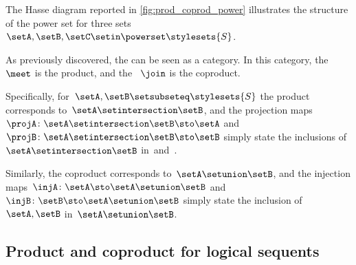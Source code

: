 \begin{marginfigure}
    \centering
    \caption{}
    \label{fig:prod_coprod_power}
\end{marginfigure}

The Hasse diagram reported in \cref{fig:prod_coprod_power} illustrates the structure of the power set  for three sets~$\setA,\setB,\setC\setin \powerset \stylesets{S}$.

As previously discovered, the  can be seen as a category.
In this category, the ~$\meet$ is the product, and the ~$\join$ is the coproduct.

Specifically, for~$\setA,\setB\setsubseteq\stylesets{S}$ the product corresponds to~$\setA\setintersection \setB$, and the projection maps~$\projA\colon \setA\setintersection \setB \sto \setA$ and~$\projB\colon \setA\setintersection \setB \sto \setB$ simply state the inclusions of~$\setA\setintersection \setB$ in~\setA and~\setB.

Similarly, the coproduct corresponds to~$\setA\setunion \setB$, and the injection maps~$\injA\colon \setA \sto \setA\setunion \setB$ and~$\injB\colon \setB \sto \setA\setunion \setB$ simply state the inclusion of~$\setA,\setB$ in~$\setA\setunion \setB$.
\vfill\clearpage
\subsection{Product and coproduct for logical sequents}

